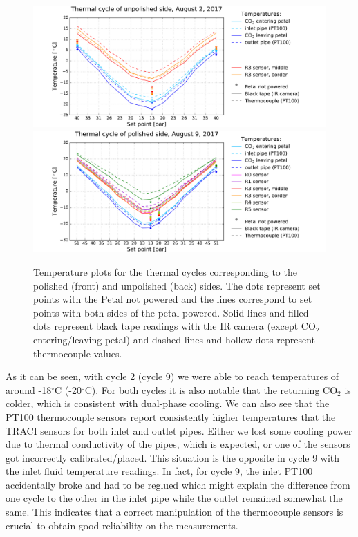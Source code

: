 		\begin{figure}[ht!]
			\centering
			\captionsetup{justification=centering,margin=0cm}
			\includegraphics[scale=0.45]{Figures/Chapter04/unwrapped_cycle_2_201711121522.pdf}
			\includegraphics[scale=0.45]{Figures/Chapter04/unwrapped_cycle_9_201711121522.pdf}
			\caption{Temperature plots for the thermal cycles corresponding to the polished (front) and unpolished (back) sides. The dots represent set points with the Petal not powered and the lines correspond to set points with both sides of the petal powered. Solid lines and filled dots represent black tape readings with the IR camera (except CO$_{2}$ entering/leaving petal) and dashed lines and hollow dots represent thermocouple values.}\label{fig4.1}
		\end{figure}
	
		As it can be seen, with cycle 2 (cycle 9) we were able to reach temperatures of around -18\space$^{\circ}$C (-20\space$^{\circ}$C). For both cycles it is also notable that the returning CO$_{2}$ is colder, which is consistent with dual-phase cooling. We can also see that the PT100 thermocouple sensors report consistently higher temperatures that the TRACI sensors for both inlet and outlet pipes. Either we lost some cooling power due to thermal conductivity of the pipes, which is expected, or one of the sensors got incorrectly calibrated/placed. This situation is the opposite in cycle 9 with the inlet fluid temperature readings. In fact, for cycle 9, the inlet PT100 accidentally broke and had to be reglued which might explain the difference from one cycle to the other in the inlet pipe while the outlet remained somewhat the same. This indicates that a correct manipulation of the thermocouple sensors is crucial to obtain good reliability on the measurements.
		
